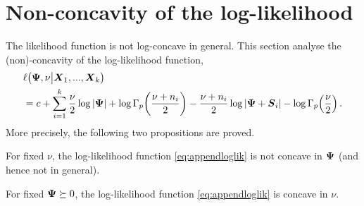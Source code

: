 \documentclass{article}\usepackage[]{graphicx}\usepackage[]{color}
\begin{document}
\section{Non-concavity of the log-likelihood}
\label{sec:concaveloglik}
The likelihood function is not log-concave in general.
This section analyse the (non)-concavity of the log-likelihood function,
\small
\begin{align}
  &\ell\!\left(\vPsi, \nu \big| \vX_1, ..., \vX_k \right) \notag \\
  &= c + \sum_{i=1}^k
            \frac{\nu}{2}  \log |\vPsi|
            + \log \Gamma_p\!\left(\frac{\nu + n_i}{2}\right)  %
           - \frac{\nu + n_i}{2}\log|\vPsi +\vS_i|
            - \log \Gamma_p\!\left(\frac{\nu}{2}\right).
            \label{eq:appendloglik}
\end{align}
\normalsize
More precisely, the following two propositions are proved.
\begin{proposition}
\label{prop:nonconcavityinpsi}
For fixed $\nu$, the log-likelihood function \eqref{eq:appendloglik} is not concave in ${\boldsymbol{\Psi}}$ (and hence not in general).
\end{proposition}
\begin{proposition}[Concavity in $\nu$]
\label{prop:concavityinnu}
For fixed ${\boldsymbol{\Psi}} \succeq 0$, the log-likelihood function \eqref{eq:appendloglik} is concave in $\nu$.
\end{proposition}
\end{document}
